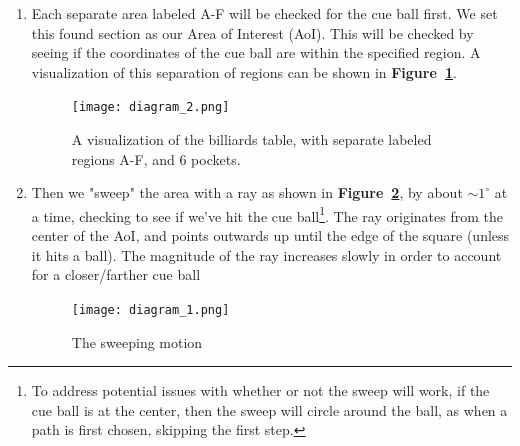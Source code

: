 \documentclass[12pt]{article}
\begin{document}
\begin{enumerate}
    \item Each separate area labeled A-F will be checked for the cue ball first. We set this found section as our Area of Interest (AoI). This will be checked by seeing if the coordinates of the cue ball are within the specified region. A visualization of this separation of regions can be shown in \textbf{Figure~\ref{fig:table}}.

    \begin{figure}[htbp]
        \centering
        \texttt{[image: diagram\_2.png]}
        \caption{A visualization of the billiards table, with separate labeled regions A-F, and 6 pockets. }
        \label{fig:table}
    \end{figure}

    
    \item Then we "sweep" the area with a ray as shown in \textbf{Figure~\ref{fig:sweep}}, by about $\sim1^{\circ}$ at a time, checking to see if we've hit the cue ball\footnote{To address potential issues with whether or not the sweep will work, if the cue ball is at the center, then the sweep will circle around the ball, as when a path is first chosen, skipping the first step.}. The ray originates from the center of the AoI, and points outwards up until the edge of the square (unless it hits a ball). The magnitude of the ray increases slowly in order to account for a closer/farther cue ball


    \FloatBarrier
    \begin{figure}[htbp]
        \centering
        \texttt{[image: diagram\_1.png]}
        \caption{The sweeping motion }
        \label{fig:sweep}
    \end{figure}
    \FloatBarrier
    

\end{enumerate}
\end{document}
